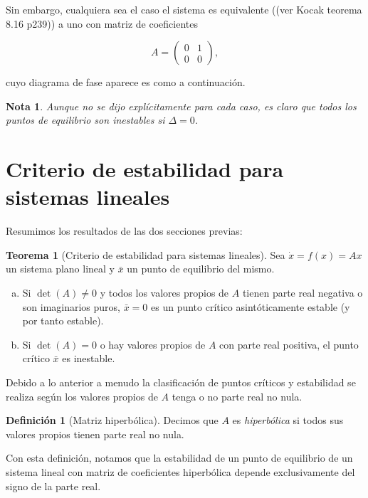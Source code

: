 \documentclass[11pt]{book}
\theoremstyle{definition}
\newtheorem{definition}{Definición}
\numberwithin{definition}{section}
\theoremstyle{theorem}
\newtheorem{theorem}{Teorema}
\numberwithin{theorem}{section}
\numberwithin{lemma}{section}
\numberwithin{corollary}{section}
\theoremstyle{plain}
\numberwithin{example}{section}
\newtheorem{remark}{Nota}
\begin{document}
Sin embargo, cualquiera sea el caso el sistema es equivalente ((ver Kocak teorema 8.16 p239)) a uno con matriz de coeficientes

$$ A = \left( \begin{array}{ll} 0 & 1 \\ 0 & 0 \end{array} \right),$$

cuyo diagrama de fase aparece es como a continuación.

\begin{remark}Aunque no se dijo explícitamente para cada caso, es claro que todos los puntos de equilibrio son \emph{inestables} si $\Delta = 0$.
\end{remark}

\section{Criterio de estabilidad para sistemas lineales}
Resumimos los resultados de las dos secciones previas:

\begin{theorem}[Criterio de estabilidad para sistemas lineales] \label{teo:criterioestabilidadlineales}
Sea $\dot{x} = f(x) = Ax$ un sistema plano lineal y $\bar{x}$ un punto de equilibrio del mismo.

\begin{enumerate}[(a)]
	\item Si $\det(A) \neq 0$ y todos los valores propios de $A$ tienen parte real negativa o son imaginarios puros, $\bar{x} = 0$ es un punto crítico asintóticamente estable (y por tanto estable).
	\item Si $\det(A) = 0$ o hay valores propios de $A$ con parte real positiva, el punto crítico $\bar{x}$ es inestable.
\end{enumerate}

Debido a lo anterior a menudo la clasificación de puntos críticos y estabilidad se realiza según los valores propios de $A$ tenga o no parte real no nula.

\begin{definition}[Matriz hiperbólica] Decimos que $A$ es \emph{hiperbólica} si todos sus valores propios tienen parte real no nula.
\end{definition}


Con esta definición, notamos que la estabilidad de un punto de equilibrio de un sistema lineal con matriz de coeficientes hiperbólica depende exclusivamente del signo de la parte real.

\end{theorem}
\end{document}
